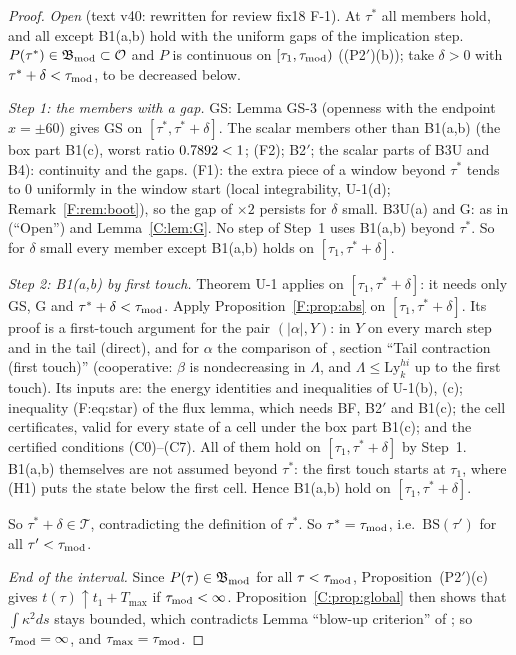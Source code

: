 \documentclass[11pt]{article}
\begin{document}
\begin{proof}
\emph{Open} (text v40: rewritten for review fix18 F-1). At $\tau^*$ all members hold, and all except B1(a,b) hold with the uniform gaps of the implication step. $P(\tau^*)\in\mathfrak B_{\rm mod}\subset\mathcal O$ and $P$ is continuous on $[\tau_1,\tau_{\rm mod})$ ((P2$'$)(b)); take $\delta>0$ with $\tau^*+\delta<\tau_{\rm mod}$, to be decreased below.

\emph{Step 1: the members with a gap.} GS: Lemma GS-3 (openness with the endpoint $x=\pm60$) gives GS on $[\tau^*,\tau^*+\delta]$. The scalar members other than B1(a,b) (the box part B1(c), worst ratio $0.7892<1$; (F2); B2$'$; the scalar parts of B3U and B4): continuity and the gaps. (F1): the extra piece of a window beyond $\tau^*$ tends to $0$ uniformly in the window start (local integrability, U-1(d);  Remark~\ref{F:rem:boot}), so the gap of $\times2$ persists for $\delta$ small. B3U(a) and G: as in  (``Open'') and Lemma~\ref{C:lem:G}. No step of Step~1 uses B1(a,b) beyond $\tau^*$. So for $\delta$ small every member except B1(a,b) holds on $[\tau_1,\tau^*+\delta]$.

\emph{Step 2: B1(a,b) by first touch.} Theorem U-1 applies on $[\tau_1,\tau^*+\delta]$: it needs only GS, G and $\tau^*+\delta<\tau_{\rm mod}$. Apply Proposition~\ref{F:prop:abs} on $[\tau_1,\tau^*+\delta]$. Its proof is a first-touch argument for the pair $(|\alpha|,Y)$: in $Y$ on every march step and in the tail (direct), and for $\alpha$ the comparison of , section ``Tail contraction (first touch)'' (cooperative: $\beta$ is nondecreasing in $\Lambda$, and $\Lambda\le\mathrm{Ly}^{hi}_k$ up to the first touch). Its inputs are: the energy identities and inequalities of U-1(b), (c); inequality (F:eq:star) of the flux lemma, which needs BF, B2$'$ and B1(c); the cell certificates, valid for every state of a cell under the box part B1(c); and the certified conditions (C0)--(C7). All of them hold on $[\tau_1,\tau^*+\delta]$ by Step~1. B1(a,b) themselves are not assumed beyond $\tau^*$: the first touch starts at $\tau_1$, where (H1) puts the state below the first cell. Hence B1(a,b) hold on $[\tau_1,\tau^*+\delta]$.

So $\tau^*+\delta\in\mathcal T$, contradicting the definition of $\tau^*$. So $\tau^*=\tau_{\rm mod}$, i.e.\ $\mathrm{BS}(\tau')$ for all $\tau'<\tau_{\rm mod}$.

\emph{End of the interval.} Since $P(\tau)\in\mathfrak B_{\rm mod}$ for all $\tau<\tau_{\rm mod}$, Proposition~(P2$'$)(c) gives $t(\tau)\uparrow t_1+T_{\max}$ if $\tau_{\rm mod}<\infty$. Proposition~\ref{C:prop:global} then shows that $\int\kappa^2ds$ stays bounded, which contradicts Lemma ``blow-up criterion'' of ; so $\tau_{\rm mod}=\infty$, and $\tau_{\max}=\tau_{\rm mod}$.
\end{proof}
\end{document}
